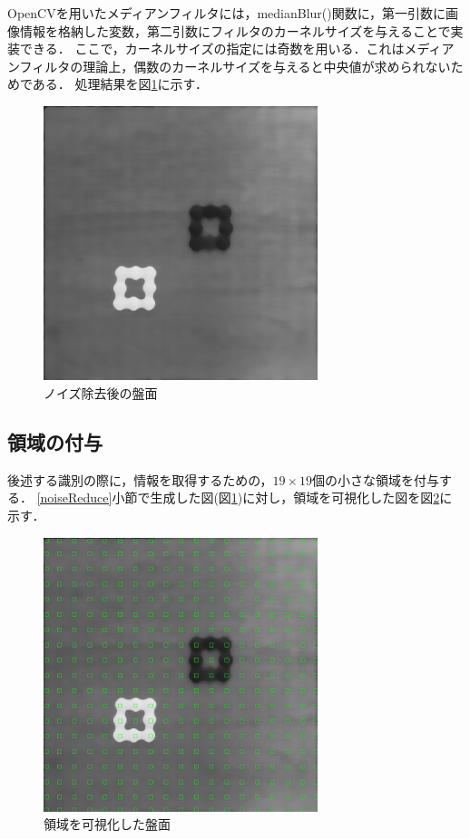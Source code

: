 \documentclass[openright]{nitocs}
\numberwithin{equation}{section}
\begin{document}
            OpenCVを用いたメディアンフィルタには，medianBlur()関数に，第一引数に画像情報を格納した変数，第二引数にフィルタのカーネルサイズを与えることで実装できる．
            ここで，カーネルサイズの指定には奇数を用いる．これはメディアンフィルタの理論上，偶数のカーネルサイズを与えると中央値が求められないためである．
            処理結果を図\ref{noiseReducedImg}に示す．
            \begin{figure}[tb] %
                \begin{center}
                \includegraphics[clip,width=80mm]{noiseReducedImg.jpg} 
                \caption{ノイズ除去後の盤面}
                \label{noiseReducedImg}
                \end{center}
            \end{figure}

        \subsection{領域の付与}
            \label{area}
            後述する識別の際に，情報を取得するための，$19\times19$個の小さな領域を付与する．
            \ref{noiseReduce}小節で生成した図(図\ref{noiseReducedImg})に対し，領域を可視化した図を図\ref{boardWithArea}に示す．
            \begin{figure}[tb] %
                \begin{center}
                \includegraphics[clip,width=80mm]{boardWithAreaImg.jpg} 
                \caption{領域を可視化した盤面}
                \label{boardWithArea}
                \end{center}
            \end{figure}
\end{document}
